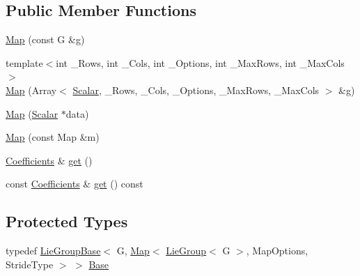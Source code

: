\subsection*{Public Member Functions}
\begin{DoxyCompactItemize}
\item 
\hyperlink{class_map_3_01_lie_group_3_01_g_01_4_00_01_map_options_00_01_stride_type_01_4_a141753f9a4186911b53b5b25cfd716ed}{Map} (const G \&g)
\item 
{\footnotesize template$<$int \+\_\+\+Rows, int \+\_\+\+Cols, int \+\_\+\+Options, int \+\_\+\+Max\+Rows, int \+\_\+\+Max\+Cols$>$ }\\\hyperlink{class_map_3_01_lie_group_3_01_g_01_4_00_01_map_options_00_01_stride_type_01_4_a33f366f2a0c009b10b35c531ee71dcb9}{Map} (Array$<$ \hyperlink{class_map_3_01_lie_group_3_01_g_01_4_00_01_map_options_00_01_stride_type_01_4_ac0fdd69f3b12cdc0b88be71c2283e9ae}{Scalar}, \+\_\+\+Rows, \+\_\+\+Cols, \+\_\+\+Options, \+\_\+\+Max\+Rows, \+\_\+\+Max\+Cols $>$ \&g)
\item 
\hyperlink{class_map_3_01_lie_group_3_01_g_01_4_00_01_map_options_00_01_stride_type_01_4_a06e9c15966f1be0bfefcadb3c8c74ad4}{Map} (\hyperlink{class_map_3_01_lie_group_3_01_g_01_4_00_01_map_options_00_01_stride_type_01_4_ac0fdd69f3b12cdc0b88be71c2283e9ae}{Scalar} $\ast$data)
\item 
\hyperlink{class_map_3_01_lie_group_3_01_g_01_4_00_01_map_options_00_01_stride_type_01_4_ae6280fe976a1f7d0a60ee211a2530857}{Map} (const Map \&m)
\item 
\hyperlink{class_map_3_01_lie_group_3_01_g_01_4_00_01_map_options_00_01_stride_type_01_4_a3140b440390b3c15c7361ab182a91f91}{Coefficients} \& \hyperlink{class_map_3_01_lie_group_3_01_g_01_4_00_01_map_options_00_01_stride_type_01_4_afdbf1ac5998b66bf071097cbc645b61c}{get} ()
\item 
const \hyperlink{class_map_3_01_lie_group_3_01_g_01_4_00_01_map_options_00_01_stride_type_01_4_a3140b440390b3c15c7361ab182a91f91}{Coefficients} \& \hyperlink{class_map_3_01_lie_group_3_01_g_01_4_00_01_map_options_00_01_stride_type_01_4_a6e202f2f5d1ba37f2b2a414bfa70a7e8}{get} () const
\end{DoxyCompactItemize}
\subsection*{Protected Types}
\begin{DoxyCompactItemize}
\item 
typedef \hyperlink{class_lie_group_base}{Lie\+Group\+Base}$<$ G, \hyperlink{class_map_3_01_lie_group_3_01_g_01_4_00_01_map_options_00_01_stride_type_01_4_a141753f9a4186911b53b5b25cfd716ed}{Map}$<$ \hyperlink{class_lie_group}{Lie\+Group}$<$ G $>$, Map\+Options, Stride\+Type $>$ $>$ \hyperlink{class_map_3_01_lie_group_3_01_g_01_4_00_01_map_options_00_01_stride_type_01_4_a09cb088c0990b2ab5558a5ecd245f2c4}{Base}
\end{DoxyCompactItemize}
